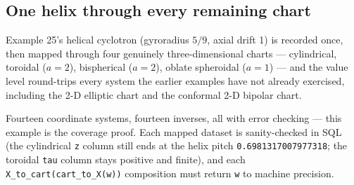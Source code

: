 \documentclass[11pt]{article}
\newcommand{\code}[1]{\texttt{#1}}
\begin{document}
\subsection{One helix through every remaining chart}

Example 25's helical cyclotron (gyroradius $5/9$, axial drift 1) is
recorded once, then mapped through four genuinely three-dimensional
charts --- cylindrical, toroidal ($a = 2$), bispherical ($a = 2$),
oblate spheroidal ($a = 1$) --- and the value level round-trips every
system the earlier examples have not already exercised, including the
2-D elliptic chart and the conformal 2-D bipolar chart.

Fourteen coordinate systems, fourteen inverses, all with error
checking --- this example is the coverage proof. Each mapped dataset
is sanity-checked in SQL (the cylindrical \code{z} column still ends
at the helix pitch \code{0.6981317007977318}; the toroidal \code{tau}
column stays positive and finite), and each
\code{X\_to\_cart(cart\_to\_X(w))} composition must return \code{w}
to machine precision.
\end{document}
